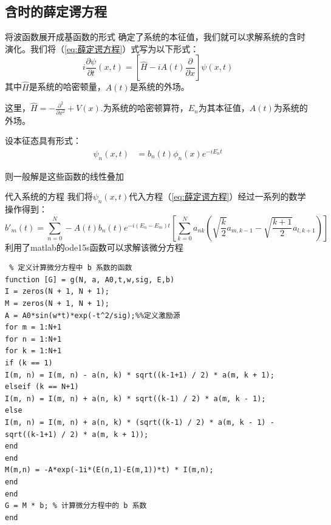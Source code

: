 \documentclass[aspectratio=169]{beamer}
\begin{document}
\subsection{含时的薛定谔方程}

\begin{frame}{将波函数展开成基函数的形式}
    确定了系统的本征值，我们就可以求解系统的含时演化。我们将（\ref{eq:薛定谔方程}）式写为以下形式：
    \begin{equation}
        i\dfrac{\partial\psi}{\partial t}(x,t)=\left[\hat{H}-iA(t)\dfrac{\partial}{\partial x}\right]\psi(x,t)
    \label{eq:系统的本征方程}
    \end{equation}
    其中$\hat{H}$是系统的哈密顿量，$A(t)$是系统的外场。
    
这里，$\hat{H}=-\frac{\partial^{2}}{\partial x^{2}}+V(x).$为系统的哈密顿算符，$E_n$为其本征值，$A(t)$为系统的外场。
     
设本征态具有形式：
\begin{align}
 \psi_n(x,t) &= b_n(t)\phi_n(x)e^{-iE_nt}
\end{align}

则一般解是这些函数的线性叠加
\end{frame}
\begin{frame}{代入系统的方程}
    我们将$\psi_n(x,t)$代入方程（\ref{eq:薛定谔方程}）经过一系列的数学操作得到：
        \begin{equation}
            \boxed{ b'_{m}(t)=\sum_{n=0}^{N}-A(t)b_{n}(t)e^{-i(E_{n}-E_{m})t}\left[\sum_{k=0}^{N}a_{nk}\left(\sqrt{\frac{k}{2}}a_{m,k-1}-\sqrt{\frac{k+1}{2}}a_{l,k+1}\right)\right]}
         \end{equation}
    利用了matlab的ode15s函数可以求解该微分方程
\end{frame}
\begin{lstlisting}
 % 定义计算微分方程中 b 系数的函数
function [G] = g(N, a, A0,t,w,sig, E,b)
I = zeros(N + 1, N + 1);
M = zeros(N + 1, N + 1);
A = A0*sin(w*t)*exp(-t^2/sig);%%定义激励源
for m = 1:N+1
for n = 1:N+1
for k = 1:N+1
if (k == 1)
I(m, n) = I(m, n) - a(n, k) * sqrt((k-1+1) / 2) * a(m, k + 1);
elseif (k == N+1)
I(m, n) = I(m, n) + a(n, k) * sqrt((k-1) / 2) * a(m, k - 1);
else
I(m, n) = I(m, n) + a(n, k) * (sqrt((k-1) / 2) * a(m, k - 1) - sqrt((k-1+1) / 2) * a(m, k + 1));
end
end
M(m,n) = -A*exp(-1i*(E(n,1)-E(m,1))*t) * I(m,n);
end
end
G = M * b; % 计算微分方程中的 b 系数
end
\end{lstlisting}
\end{document}
